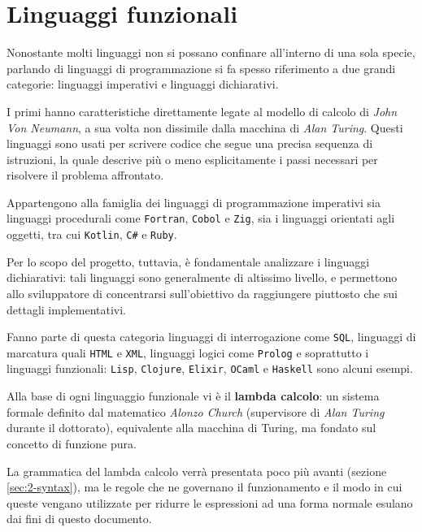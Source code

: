 \section{Linguaggi funzionali}
\label{sec:2-functional-languages}

Nonostante molti linguaggi non si possano confinare all'interno di una sola specie,
parlando di linguaggi di programmazione si fa spesso riferimento a due grandi categorie:
linguaggi imperativi e linguaggi dichiarativi.


I primi hanno caratteristiche direttamente legate al modello di calcolo di \textit{John Von Neumann},
a sua volta non dissimile dalla macchina di \textit{Alan Turing}.
Questi linguaggi sono usati per scrivere codice che segue una precisa sequenza di istruzioni,
la quale descrive più o meno esplicitamente i passi necessari per risolvere il problema affrontato.

\noindent Appartengono alla famiglia dei linguaggi di programmazione imperativi sia linguaggi procedurali come
\texttt{Fortran}, \texttt{Cobol} e \texttt{Zig}, sia i linguaggi orientati agli oggetti, tra cui \texttt{Kotlin}, \texttt{C\#} e \texttt{Ruby}.


Per lo scopo del progetto, tuttavia, è fondamentale analizzare i linguaggi dichiarativi:
tali linguaggi sono generalmente di altissimo livello, e permettono allo sviluppatore di
concentrarsi sull'obiettivo da raggiungere piuttosto che sui dettagli implementativi.

\noindent Fanno parte di questa categoria linguaggi di interrogazione come \texttt{SQL}, linguaggi di marcatura
quali \texttt{HTML} e \texttt{XML}, linguaggi logici come \texttt{Prolog} e soprattutto i linguaggi funzionali:
\texttt{Lisp}, \texttt{Clojure}, \texttt{Elixir}, \texttt{OCaml} e \texttt{Haskell} sono alcuni esempi.


Alla base di ogni linguaggio funzionale vi è il \textbf{lambda calcolo}: un sistema formale definito dal
matematico \textit{Alonzo Church} (supervisore di \textit{Alan Turing} durante il dottorato),
equivalente alla macchina di Turing, ma fondato sul concetto di funzione pura.

\newpage

\noindent La grammatica del lambda calcolo verrà presentata poco più avanti (sezione \ref{sec:2-syntax}),
ma le regole che ne governano il funzionamento e il modo in cui queste vengano utilizzate per ridurre
le espressioni ad una forma normale esulano dai fini di questo documento.

